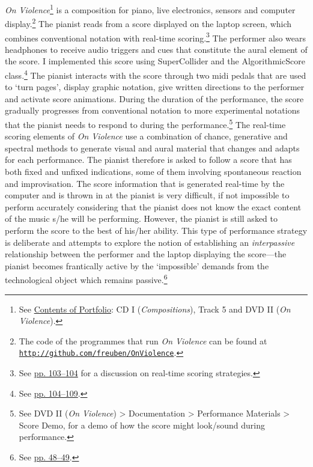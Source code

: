  \emph{On Violence}\footnote{See \hyperlink{portfolio}{Contents of Portfolio}: CD I (\emph{Compositions}), Track 5 and DVD II (\emph{On Violence}).} is a composition for piano, live electronics, sensors and computer display.\footnote{The code of the programmes that run \emph{On Violence} can be found at \href{http://github.com/freuben/OnViolence}{\texttt {http://github.com/freuben/OnViolence}}.} The pianist reads from a score displayed on the laptop screen, which combines conventional notation with real-time scoring.\footnote{See \hyperlink{realtimescore}{pp. 103--104} for a discussion on real-time scoring strategies.} The performer also wears headphones to receive audio triggers and cues that constitute the aural element of the score. I implemented this score using SuperCollider and the AlgorithmicScore class.\footnote{See \hyperlink{algoscore}{pp. 104--109}.} The pianist interacts with the score through two midi pedals that are used to `turn pages', display graphic notation, give written directions to the performer and activate score animations. During the duration of the performance, the score gradually progresses from conventional notation to more experimental notations that the pianist needs to respond to during the performance.\footnote{See DVD II (\emph{On Violence}) \tiny \textgreater \footnotesize \hspace{0pt} Documentation \tiny \textgreater \footnotesize \hspace{0pt} Performance Materials \tiny \textgreater \footnotesize \hspace{0pt} Score Demo, for a demo of how the score might look/sound during performance.} The real-time scoring elements of \emph{On Violence} use a combination of chance, generative and spectral methods to generate visual and aural material that changes and adapts for each performance. The pianist therefore is asked to follow a score that has both fixed and unfixed indications, some of them involving spontaneous reaction and improvisation. The score information that is generated real-time by the computer and is thrown in at the pianist is very difficult, if not impossible to perform accurately considering that the pianist does not know the exact content of the music s/he will be performing. However, the pianist is still asked to perform the score to the best of his/her ability. This type of performance strategy is deliberate and attempts to explore the notion of establishing an \emph{interpassive} relationship between the performer and the laptop displaying the score---the pianist becomes frantically active by the `impossible' demands from the technological object which remains passive.\footnote{See \hyperlink{zizekinterpassiv}{pp. 48--49}.}

